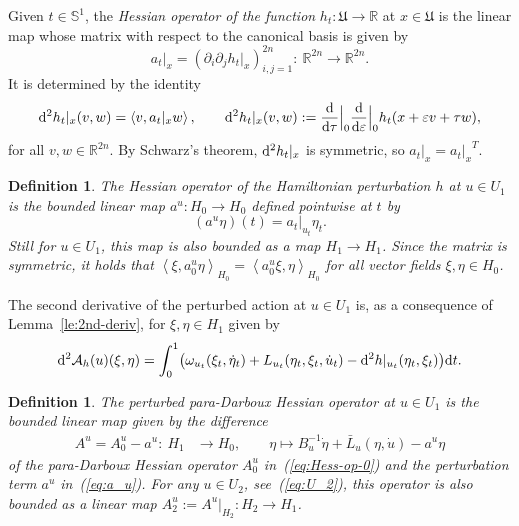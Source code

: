 \documentclass[pdftex]{sigma}
\numberwithin{equation}{section}
\newtheorem{Definition}[Theorem]{Definition}
\newcommand{\R}{{\mathbb{R}}}
\renewcommand{\SS}{{\mathbb{S}}}
\newcommand{\Aa}{{\mathcal{A}}} %
\newcommand{\eps}{{\varepsilon}}
\newcommand{\INNER}[2]{\left\langle #1, #2\right\rangle}
\newcommand{\p}{{\partial}}
\newcommand{\1}{{{\mathchoice {\rm 1\mskip-4mu l} {\rm 1\mskip-4mu l}
{\rm 1\mskip-4.5mu l} {\rm 1\mskip-5mu l}}}}
\begin{document}
Given $t\in\SS^1$, the \textit{Hessian operator of the function}
$h_t\colon\mathfrak{U}\to\R$ at $x\in\mathfrak{U}$ is the linear map
whose matrix with respect to the canonical basis is given by
\begin{equation}\label{eq:matrix-a_t}
 a_t|_x=(\p_i\p_j h_t|_x)_{i,j=1}^{2n}\colon\ \R^{2n}\to\R^{2n} .
\end{equation}
It is determined by the identity
\[
 {\rm d}^2h_t|_x(v,w)
 =\INNER{v}{a_t|_x w}
 ,\qquad
 {\rm d}^2h_t|_x(v,w)
 :=\frac{{\rm d}}{{\rm d}\tau}\Big|_{0}\frac{{\rm d}}{{\rm d}\eps}\Big|_{0}
 h_t(x+\eps v+\tau w),
\]
for all $v,w\in\R^{2n}$. By Schwarz's theorem, ${\rm d}^2h_t|_x$ is
symmetric, so $a_t|_x={a_t|_x}^T$.

\begin{Definition}%
The \textit{Hessian operator of the Hamiltonian perturbation} $h$
at $u\in U_1$ is the bounded linear map $a^u\colon H_0\to H_0$
defined pointwise at $t$ by
\begin{equation}\label{eq:a_u}
 (a^u\eta )(t)=a_t|_{u_t}\eta_t .
\end{equation}
Still for $u\in U_1$,
this map is also bounded as a map $H_1\to H_1$.
Since the matrix is symmetric, it holds that
$ \INNER{\xi}{a^u_0\eta}_{H_0}=\INNER{a^u_0\xi}{\eta}_{H_0}$
for all vector fields $\xi,\eta\in H_0$.
\end{Definition}

The second derivative of the perturbed action at $u\in U_1$ is, as
a consequence of Lemma~\ref{le:2nd-deriv},
for $\xi,\eta\in H_1$ given by
\begin{equation*}
\begin{split}
 {\rm d}^2\Aa_h(u) (\xi,\eta )
 =\int_0^1\bigl( \omega_{u_t}(\xi_t,\dot\eta_t)
 + L_{u_t}(\eta_t,\xi_t,\dot u_t)
 - {\rm d}^2h|_{u_t}(\eta_t,\xi_t)
 \bigr) {\rm d}t .
\end{split}
\end{equation*}

\begin{Definition}%
The \textit{perturbed para-Darboux Hessian operator}
at $u\in U_1$ is the bounded linear map given by the difference
\begin{equation}\label{eq:Hess-op}
\begin{split}
 A^u=A_0^u-a^u\colon\ H_1&\to H_0,
 \qquad
 \eta \mapsto B_u^{-1}\dot \eta+\bar L_u(\eta,\dot u) -a^u\eta
\end{split}
\end{equation}
of the para-Darboux Hessian operator $A_0^u$ in~(\ref{eq:Hess-op-0})
and the perturbation term $a^u$ in~(\ref{eq:a_u}).
For any $u\in U_2$, see~(\ref{eq:U_2}),
this operator is also bounded as a linear map
$
 A^u_2:=A^u|_{H_2}\colon H_2\to H_1
$.
\end{Definition}
\end{document}
